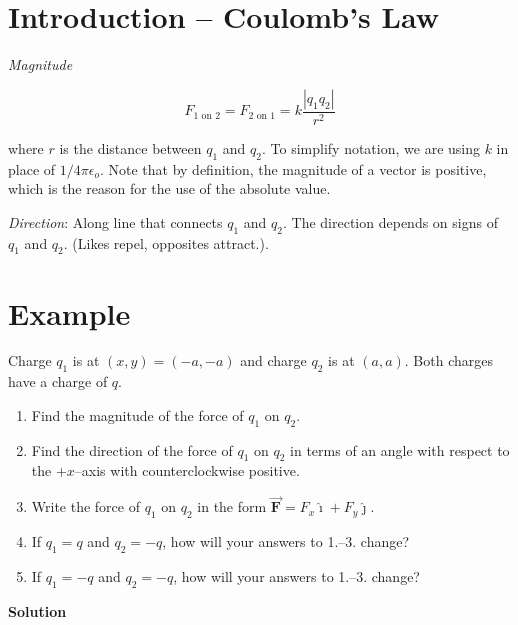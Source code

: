 \documentclass{article}
\renewcommand{\mbox}{\text}
\newcommand{\ihat}[0]{\hat{\boldsymbol{\imath}}}
\newcommand{\jhat}[0]{\hat{\boldsymbol{\jmath}}}
\newcommand{\bfvec}[1]{\vec{\mathbf{#1}}}
\begin{document}

\section{Introduction -- Coulomb's Law}

\emph{Magnitude}

$$F_{1\mbox{ on } 2}=F_{2\mbox{ on } 1}=k\frac{|q_1q_2|}{r^2}$$

where $r$ is the distance between $q_1$ and $q_2$. To simplify notation, we are using $k$ in place of $1/4\pi\epsilon_o$. Note that by definition, the magnitude of a vector is positive, which is the reason for the use of the absolute value.

\emph{Direction}: Along line that connects $q_1$ and $q_2$. The direction depends on signs of $q_1$ and $q_2$. (Likes repel, opposites attract.).

\section{Example}

Charge $q_1$ is at $(x,y)=(-a,-a)$ and charge $q_2$ is at $(a, a)$. Both charges have a charge of $q$.

\begin{enumerate}

  \item Find the magnitude of the force of $q_1$ on $q_2$.

  \item Find the direction of the force of $q_1$ on $q_2$ in terms of an angle with respect to the $+x$--axis with counterclockwise positive.

  \item Write the force of $q_1$ on $q_2$ in the form $\bfvec{F}=F_x\ihat + F_y\jhat$.

  \item If $q_1=q$ and $q_2=-q$, how will your answers to 1.--3. change?

  \item If $q_1=-q$ and $q_2=-q$, how will your answers to 1.--3. change?

\end{enumerate}

\textbf{Solution}
\end{document}
